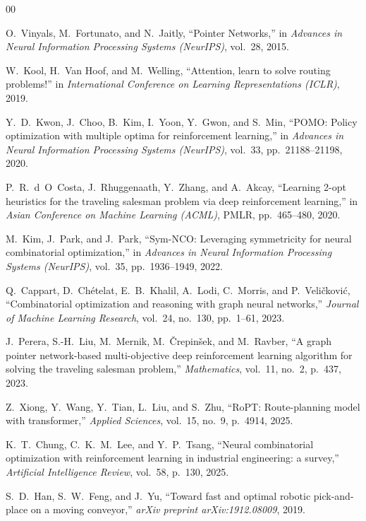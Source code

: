 \documentclass[conference]{IEEEtran}
\begin{document}
\begin{thebibliography}{00}

 O.~Vinyals, M.~Fortunato, and N.~Jaitly, ``Pointer Networks,'' in \emph{Advances in Neural Information Processing Systems (NeurIPS)}, vol.~28, 2015.

 W.~Kool, H.~Van Hoof, and M.~Welling, ``Attention, learn to solve routing problems!'' in \emph{International Conference on Learning Representations (ICLR)}, 2019.

 Y.~D.~Kwon, J.~Choo, B.~Kim, I.~Yoon, Y.~Gwon, and S.~Min, ``POMO: Policy optimization with multiple optima for reinforcement learning,'' in \emph{Advances in Neural Information Processing Systems (NeurIPS)}, vol.~33, pp.~21188--21198, 2020.

 P.~R.~d~O~Costa, J.~Rhuggenaath, Y.~Zhang, and A.~Akcay, ``Learning 2-opt heuristics for the traveling salesman problem via deep reinforcement learning,'' in \emph{Asian Conference on Machine Learning (ACML)}, PMLR, pp.~465--480, 2020.

 M.~Kim, J.~Park, and J.~Park, ``Sym-NCO: Leveraging symmetricity for neural combinatorial optimization,'' in \emph{Advances in Neural Information Processing Systems (NeurIPS)}, vol.~35, pp.~1936--1949, 2022.

 Q.~Cappart, D.~Ch\'{e}telat, E.~B.~Khalil, A.~Lodi, C.~Morris, and P.~Veli\v{c}kovi\'{c}, ``Combinatorial optimization and reasoning with graph neural networks,'' \emph{Journal of Machine Learning Research}, vol.~24, no.~130, pp.~1--61, 2023.

 J.~Perera, S.-H.~Liu, M.~Mernik, M.~\v{C}repin\v{s}ek, and M.~Ravber, ``A graph pointer network-based multi-objective deep reinforcement learning algorithm for solving the traveling salesman problem,'' \emph{Mathematics}, vol.~11, no.~2, p.~437, 2023.

 Z.~Xiong, Y.~Wang, Y.~Tian, L.~Liu, and S.~Zhu, ``RoPT: Route-planning model with transformer,'' \emph{Applied Sciences}, vol.~15, no.~9, p.~4914, 2025.

 K.~T.~Chung, C.~K.~M.~Lee, and Y.~P.~Tsang, ``Neural combinatorial optimization with reinforcement learning in industrial engineering: a survey,'' \emph{Artificial Intelligence Review}, vol.~58, p.~130, 2025.

 S.~D.~Han, S.~W.~Feng, and J.~Yu, ``Toward fast and optimal robotic pick-and-place on a moving conveyor,'' \emph{arXiv preprint arXiv:1912.08009}, 2019.


\end{thebibliography}
\end{document}
